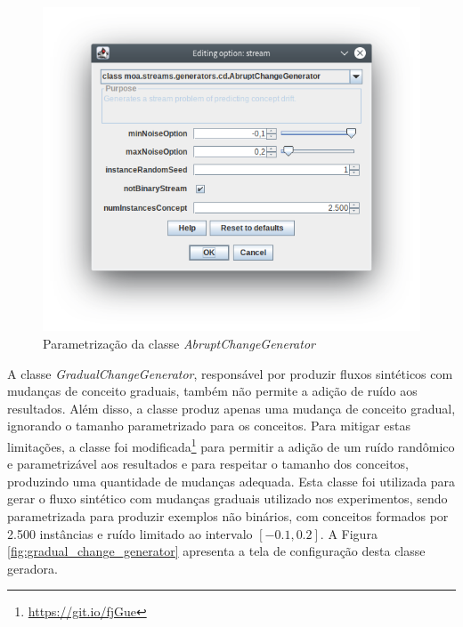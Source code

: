 \documentclass[qual, classic, a4paper]{ufbathesis}
\begin{document}
\begin{figure}[H]
    \begin{center}
        \includegraphics[width=\textwidth]{imagens/abrupt_change_generator.png}
        \caption{Parametrização da classe \textit{AbruptChangeGenerator}}
        \label{fig:abrupt_change_generator}
    \end{center}
\end{figure}

A classe \textit{GradualChangeGenerator}, responsável por produzir fluxos sintéticos com mudanças de conceito graduais, também não permite a adição de ruído aos resultados.
Além disso, a classe produz apenas uma mudança de conceito gradual, ignorando o tamanho parametrizado para os conceitos.
Para mitigar estas limitações, a classe foi modificada\footnote{\url{https://git.io/fjGue}} para permitir a adição de um ruído randômico 
e parametrizável aos resultados e para respeitar o tamanho dos conceitos, produzindo uma quantidade de mudanças adequada.
Esta classe foi utilizada para gerar o fluxo sintético com mudanças graduais utilizado nos experimentos, 
sendo parametrizada para produzir exemplos não binários, 
com conceitos formados por 2.500 instâncias e ruído limitado ao intervalo $[-0.1, 0.2]$.
A Figura \ref{fig:gradual_change_generator} apresenta a tela de configuração desta classe geradora.
\end{document}
